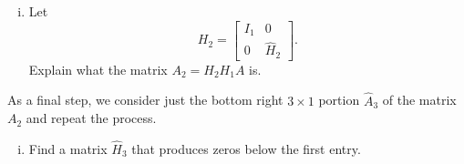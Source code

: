 \begin{pactivity}
\begin{enumerate}[i.]
	\item Let 
\[H_2 =  \left[ \begin{array}{cc} I_1&0 \\ 0&\hat{H}_2 \end{array} \right].\]
Explain what the matrix $A_2 = H_2H_1A$ is. 

\begin{comment}

\solution We have 
\begin{align*}
H_2H_1A &= H_2A_1 \\
	&= \left[ \begin{array}{cc} I_1&\vzero^{\tr}\\ \vzero&\hat{H_2} \end{array} \right] \left[ \begin{array}{rc}-10.0000&-10.0000[1 \ 0]  \\ \vzero&\hat{A}_2 \end{array} \right] \\
	&= \left[ \begin{array}{rrr} 
-10.0000&-10.0000&-10.0000 \\
0.0000&1.7321&0.0000\\ 
0.0000& 0.0000&-0.4606 \\
0.0000& 0.0000&-1.2687\\ 
0.0000& 0.0000&-0.4222
\end{array} \right].
\end{align*}

\end{comment}

	\end{enumerate} 
	
\item As a final step, we consider just the bottom right $3 \times 1$ portion $\hat{A}_3$ of the matrix $A_2$ and repeat the process.
	\begin{enumerate}[i.]
	\item Find a matrix $\hat{H}_3$ that produces zeros below the first entry.


\end{enumerate}
\end{pactivity}
